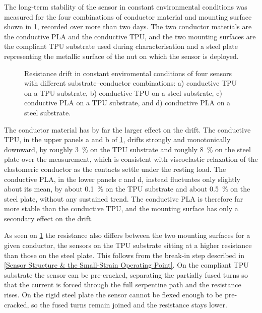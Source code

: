 
The long-term stability of the sensor in constant environmental conditions was measured for the four combinations of conductor material and mounting surface shown in \cref{fig:2by2_drift}, recorded over more than two days. The two conductor materials are the conductive PLA and the conductive TPU, and the two mounting surfaces are the compliant TPU substrate used during characterisation and a steel plate representing the metallic surface of the nut on which the sensor is deployed.

\begin{figure}[H]
\centering

    \caption{Resistance drift in constant enviromental conditions of four sensors with different substrate–conductor combinations: a) conductive TPU on a TPU substrate, b) conductive TPU on a steel substrate, c) conductive PLA on a TPU substrate, and d) conductive PLA on a steel substrate.}
    \label{fig:2by2_drift}
\end{figure}

The conductor material has by far the larger effect on the drift. The conductive TPU, in the upper panels a and b of \cref{fig:2by2_drift}, drifts strongly and monotonically downward, by roughly \SI{3}{\percent} on the TPU substrate and roughly \SI{8}{\percent} on the steel plate over the measurement, which is consistent with viscoelastic relaxation of the elastomeric conductor as the contacts settle under the resting load. The conductive PLA, in the lower panels c and d, instead fluctuates only slightly about its mean, by about \SI{0.1}{\percent} on the TPU substrate and about \SI{0.5}{\percent} on the steel plate, without any sustained trend. The conductive PLA is therefore far more stable than the conductive TPU, and the mounting surface has only a secondary effect on the drift.
 
As seen on \cref{fig:2by2_drift} the resistance also differs between the two mounting surfaces for a given conductor, the sensors on the TPU substrate sitting at a higher resistance than those on the steel plate. This follows from the break-in step described in \cref{Sensor Structure & the Small-Strain Operating Point}. On the compliant TPU substrate the sensor can be pre-cracked, separating the partially fused turns so that the current is forced through the full serpentine path and the resistance rises. On the rigid steel plate the sensor cannot be flexed enough to be pre-cracked, so the fused turns remain joined and the resistance stays lower.
